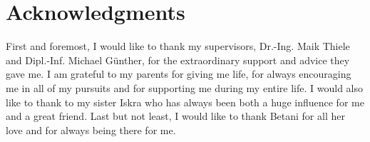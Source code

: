 
\chapter*{Acknowledgments}
First and foremost, I would like to thank my supervisors, Dr.-Ing. Maik Thiele and Dipl.-Inf. Michael Günther, for the extraordinary support and advice they gave me. I am grateful to my parents for giving me life, for always encouraging me in all of my pursuits and for supporting me during my entire life. I would also like to thank to my sister Iskra who has always been both a huge influence for me and a great friend. Last but not least, I would like to thank Betani for all her love and for always being there for me.